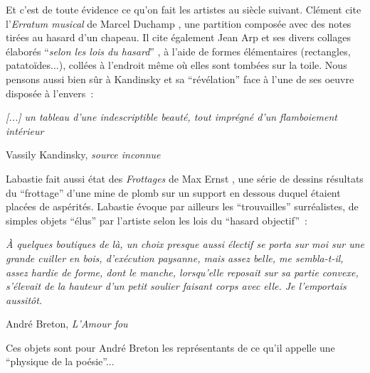 \documentclass{article}
\newenvironment{citationbox}
{\begin{center}
		\begin{minipage}{.8\textwidth}
		}
		{
		\end{minipage}	
\end{center}
}
\begin{document}
			Et c'est de toute évidence ce qu'on fait les artistes au siècle suivant. Clément cite l'\textit{Erratum musical} de Marcel Duchamp \cite{duchamp1915}, une partition composée avec des notes tirées au hasard d'un chapeau. Il cite également Jean Arp et ses divers collages élaborés ``\textit{selon les lois du hasard}'' \cite{arp1916}, à l'aide de formes élémentaires (rectangles, patatoïdes...), collées à l'endroit même où elles sont tombées sur la toile. Nous pensons aussi bien sûr à Kandinsky et sa ``révélation'' face à l'une de ses oeuvre disposée à l'envers~:
			\begin{citationbox}
				\textit{[...] un tableau d'une indescriptible beauté, tout imprégné d'un flamboiement intérieur}
				\begin{flushright}
					Vassily Kandinsky, \textit{source inconnue}
				\end{flushright}
			\end{citationbox}
			Labastie fait aussi état des \textit{Frottages} de Max Ernst \cite{ernst1926}, une série de dessins résultats du ``frottage'' d'une mine de plomb sur un support en dessous duquel étaient placées de aspérités. Labastie évoque par ailleurs les ``trouvailles'' surréalistes, de simples objets ``élus'' par l'artiste selon les lois du ``hasard objectif''~:
			\begin{citationbox}
				\textit{À quelques boutiques de là, un choix presque aussi électif se porta sur moi sur une grande cuiller en bois, d'exécution paysanne, mais assez belle, me sembla-t-il, assez hardie de forme, dont le manche, lorsqu'elle reposait sur sa partie convexe, s'élevait de la hauteur d'un petit soulier faisant corps avec elle. Je l'emportais aussitôt.}\\
				\begin{flushright}
					André Breton, \textit{L'Amour fou}\cite{breton1937}
				\end{flushright}
			\end{citationbox}
			Ces objets sont pour André Breton les représentants de ce qu'il appelle une ``physique de la poésie''...\\
			
\end{document}
